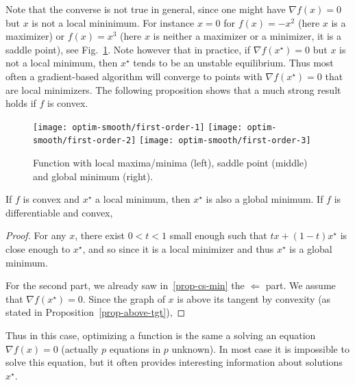 Note that the converse is not true in general, since one might have $\nabla f(x)=0$ but $x$ is not a local mininimum. For instance $x=0$ for $f(x)=-x^2$ (here $x$ is a maximizer) or $f(x)=x^3$ (here $x$ is neither a maximizer or a minimizer, it is a saddle point), see Fig.~\ref{fig-first-order}. 
%
Note however that in practice, if $\nabla f(x^\star) = 0$ but $x$ is not a local minimum, then $x^\star$ tends to be an unstable equilibrium. Thus most often a gradient-based algorithm will converge to points with $\nabla f(x^\star) = 0$ that are local minimizers.
%
The following proposition shows that a much strong result holds if $f$ is convex.

\begin{figure}
\centering
\texttt{[image: optim-smooth/first-order-1]} \quad
\texttt{[image: optim-smooth/first-order-2]} \quad
\texttt{[image: optim-smooth/first-order-3]} 
\caption{\label{fig-first-order}
Function with local maxima/minima (left),  saddle point (middle) and global minimum (right). 
}
\end{figure}


\begin{prop} 
If $f$ is convex and $x^\star$ a local minimum, then $x^\star$ is also a global minimum.
If $f$ is differentiable and convex, 
\end{prop}
\begin{proof}
For any $x$, there exist $0<t<1$ small enough such that $tx + (1-t)x^\star$ is close enough to $x^\star$, and so since it is a local minimizer
and thus $x^\star$ is a global minimum.

For the second part, we already saw in~\eqref{prop-cs-min} the $\Leftarrow$ part. We assume that $\nabla f(x^\star)=0$. Since the graph of $x$ is above its tangent by convexity (as stated in Proposition~\ref{prop-above-tgt}), 
\end{proof}

Thus in this case, optimizing a function is the same a solving an equation $\nabla f(x)=0$ (actually $p$ equations in $p$ unknown).
%
In most case it is impossible to solve this equation, but it often provides interesting information about solutions $x^\star$.



